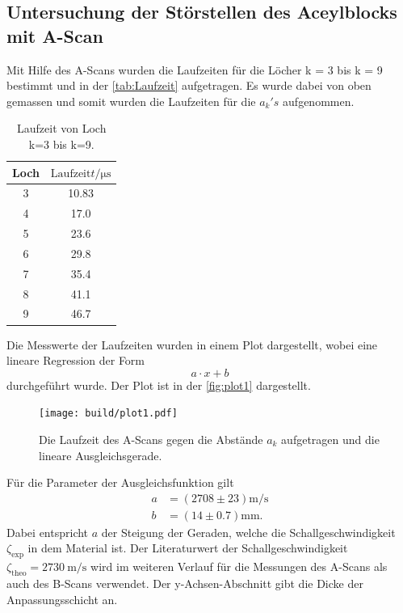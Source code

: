 \subsection{Untersuchung der Störstellen des Aceylblocks mit A-Scan}
\label{Untersuchung der Störstellen des Aceylblocks mit A-Scan}
Mit Hilfe des A-Scans wurden die Laufzeiten für die Löcher k = 3 bis k = 9 bestimmt und in der 
\autoref{tab:Laufzeit} aufgetragen. Es wurde dabei von oben gemassen und somit wurden die Laufzeiten für die
$a_k's$ aufgenommen. 
\begin{table}[H]
    \centering
    \caption{Laufzeit von Loch k=3 bis k=9.}
    \label{tab:Laufzeit}
\begin{tabular}{c c}
    \toprule
    Loch & $\text{Laufzeit} t / \si{\micro\second} $\\
    \midrule
     3 & 10.83 \\
     4 &  17.0 \\
     5 &  23.6 \\
     6 &  29.8 \\
     7 &  35.4 \\
     8 &  41.1 \\
     9 &  46.7 \\
    \bottomrule
\end{tabular}
\end{table}
Die Messwerte der Laufzeiten wurden in einem Plot dargestellt, wobei eine lineare Regression der Form 
\begin{equation*}
    a \cdot x + b
\end{equation*}
durchgeführt wurde. Der Plot ist in der \autoref{fig:plot1} dargestellt.

\begin{figure}[H]
	\texttt{[image: build/plot1.pdf]}
	\captionsetup{width=0.765\linewidth}
	\caption{Die Laufzeit des A-Scans gegen die Abstände $a_k$ aufgetragen und die lineare Ausgleichsgerade.}
	\label{fig:plot1}
\end{figure}

Für die Parameter der Ausgleichsfunktion gilt
\begin{align*}
    a &= \left(2708 \pm 23\right) \si{\meter \per \second}\\
    b &= \left(14 \pm 0.7\right) \si{\milli\meter}.
\end{align*}
Dabei entspricht $a$ der Steigung der Geraden, welche die Schallgeschwindigkeit $\zeta_{\text{exp}}$ in dem Material ist.
Der Literaturwert der Schallgeschwindigkeit $\zeta_{\text{theo}} = \SI{2730}{\meter\per\second}$ wird im weiteren Verlauf für die 
Messungen des A-Scans als auch des B-Scans verwendet.
Der y-Achsen-Abschnitt gibt die Dicke der Anpassungsschicht an. 

